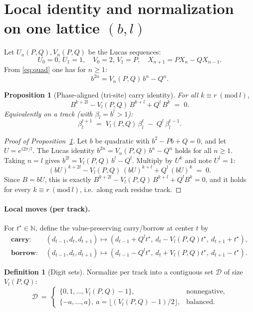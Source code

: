 \documentclass[11pt]{article}
\newtheorem{proposition}[theorem]{Proposition}
\theoremstyle{definition}
\newtheorem{definition}[theorem]{Definition}
\theoremstyle{remark}
\newcommand{\N}{\mathbb{N}}
\begin{document}
\section{Local identity and normalization on one lattice $(b,l)$}\label{sec:one-lattice}

Let $U_n(P,Q),V_n(P,Q)$ be the Lucas sequences:
\[
U_0=0,\,U_1=1,\quad V_0=2,\,V_1=P,\quad X_{n+1}=P X_n - Q X_{n-1}.
\]
From \eqref{eq:quad} one has for $n\ge1$:
\begin{equation}\label{eq:lucas-power}
b^{2n}=V_n(P,Q)\,b^n - Q^n.
\end{equation}

\begin{proposition}[Phase-aligned (tri-site) carry identity]\label{prop:carry-general}
For all $k\equiv r\ (\mathrm{mod}\ l)$,
\begin{equation}\label{eq:carry-general}
B^{k+2l} - V_l(P,Q)\,B^{k+l} + Q^{l}\,B^{k} \;=\; 0.
\end{equation}
Equivalently on a track (with $\beta_l=b^l>1$):
\[
\beta_l^{t+1} \;=\; V_l(P,Q)\,\beta_l^t \;-\; Q^l\,\beta_l^{t-1}.
\]
\end{proposition}

\begin{proof}[Proof of Proposition~\ref{prop:carry-general}]
Let $b$ be quadratic with $b^2-Pb+Q=0$, and let $U=e^{i2\pi/l}$. The Lucas identity
$b^{2n}=V_n(P,Q)\,b^{n}-Q^{n}$ holds for all $n\ge1$. Taking $n=l$ gives
$b^{2l}=V_l(P,Q)\,b^{l}-Q^l$. Multiply by $U^{k}$ and note $U^{l}=1$:
\[
(bU)^{k+2l} - V_l(P,Q)\,(bU)^{k+l} + Q^{l}\,(bU)^k \;=\; 0.
\]
Since $B=bU$, this is exactly $B^{k+2l} - V_l(P,Q)\,B^{k+l} + Q^{l}B^k=0$, and it holds for every $k\equiv r\ (\mathrm{mod}\ l)$, i.e.\ along each residue track.
\end{proof}

\paragraph{Local moves (per track).}
For $t^\star\in\N$, define the value-preserving carry/borrow at center $t$ by
\begin{align}
\textbf{carry: }&(d_{t-1},d_t,d_{t+1})\mapsto (d_{t-1}+Q^{l}t^\star,\ d_t-V_l(P,Q)t^\star,\ d_{t+1}+t^\star),\label{eq:carry}\\
\textbf{borrow: }&(d_{t-1},d_t,d_{t+1})\mapsto (d_{t-1}-Q^{l}t^\star,\ d_t+V_l(P,Q)t^\star,\ d_{t+1}-t^\star).\nonumber
\end{align}

\begin{definition}[Digit sets]\label{def:digits}
Normalize per track into a contiguous set $\mathcal D$ of size $V_l(P,Q)$:
\[
\mathcal D\ =\
\begin{cases}
\{0,1,\dots,V_l(P,Q)-1\}, & \text{nonnegative},\\[2pt]
\{-a,\dots,a\},\ a=\big\lfloor(V_l(P,Q)-1)/2\big\rfloor, & \text{balanced}.
\end{cases}
\]
\end{definition}
\end{document}
